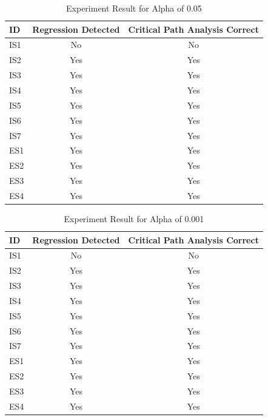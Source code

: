 \documentclass[conference]{configs/IEEEtran}
\begin{document}
\begin{table}[!htb]
	\caption{Experiment Result for Alpha of 0.05}
	\label{test-2}
	\centering
	\begin{tabular}{|l|c|c|}
		\hline
		\textbf{ID} & \multicolumn{1}{l|}{\textbf{Regression Detected}} & \multicolumn{1}{l|}{\textbf{Critical Path Analysis Correct}} \\ \hline
		IS1 & No & No \\ \hline
		IS2 & Yes & Yes \\ \hline
		IS3 & Yes & Yes \\ \hline
		IS4 & Yes & Yes \\ \hline
		IS5 & Yes & Yes \\ \hline
		IS6 & Yes & Yes \\ \hline
		IS7 & Yes & Yes \\ \hline
		ES1 & Yes & Yes \\ \hline
		ES2 & Yes & Yes \\ \hline
		ES3 & Yes & Yes \\ \hline
		ES4 & Yes & Yes \\ \hline
	\end{tabular}
\end{table}
\begin{table}[!htb]
	\caption{Experiment Result for Alpha of 0.001}
	\label{test-3}
	\centering
	\begin{tabular}{|l|c|c|}
		\hline
		\textbf{ID} & \multicolumn{1}{l|}{\textbf{Regression Detected}} & \multicolumn{1}{l|}{\textbf{Critical Path Analysis Correct}} \\ \hline
		IS1 & No & No \\ \hline
		IS2 & Yes & Yes \\ \hline
		IS3 & Yes & Yes \\ \hline
		IS4 & Yes & Yes \\ \hline
		IS5 & Yes & Yes \\ \hline
		IS6 & Yes & Yes \\ \hline
		IS7 & Yes & Yes \\ \hline
		ES1 & Yes & Yes \\ \hline
		ES2 & Yes & Yes \\ \hline
		ES3 & Yes & Yes \\ \hline
		ES4 & Yes & Yes \\ \hline
	\end{tabular}
\end{table}

\pagebreak
\end{document}
